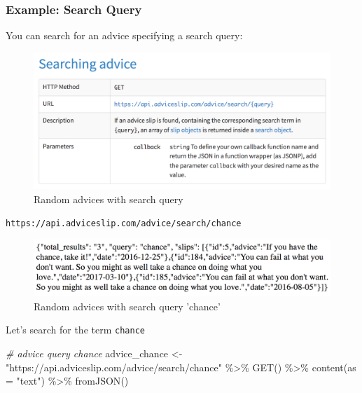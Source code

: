 \documentclass[
]{book}
\newenvironment{Shaded}{\begin{snugshade}}{\end{snugshade}}
\newcommand{\AttributeTok}[1]{\textcolor[rgb]{0.77,0.63,0.00}{#1}}
\newcommand{\CommentTok}[1]{\textcolor[rgb]{0.56,0.35,0.01}{\textit{#1}}}
\newcommand{\FunctionTok}[1]{\textcolor[rgb]{0.00,0.00,0.00}{#1}}
\newcommand{\NormalTok}[1]{#1}
\newcommand{\OtherTok}[1]{\textcolor[rgb]{0.56,0.35,0.01}{#1}}
\newcommand{\SpecialCharTok}[1]{\textcolor[rgb]{0.00,0.00,0.00}{#1}}
\newcommand{\StringTok}[1]{\textcolor[rgb]{0.31,0.60,0.02}{#1}}
\begin{document}
\hypertarget{example-search-query}{%
\subsubsection*{Example: Search Query}\label{example-search-query}}

You can search for an advice specifying a search query:

\begin{figure}

{\centering \includegraphics[width=0.7\linewidth]{images/api/advice-slip-search} 

}

\caption{Random advices with search query}\label{fig:unnamed-chunk-125}
\end{figure}

\texttt{https://api.adviceslip.com/advice/search/chance}

\begin{figure}

{\centering \includegraphics[width=0.75\linewidth]{images/api/advice-slip-chance} 

}

\caption{Random advices with search query 'chance'}\label{fig:unnamed-chunk-126}
\end{figure}

Let's search for the term \texttt{chance}

\begin{Shaded}
\begin{Highlighting}[]
\CommentTok{\# advice query \textquotesingle{}chance\textquotesingle{}}
\NormalTok{advice\_chance }\OtherTok{\textless{}{-}} \StringTok{"https://api.adviceslip.com/advice/search/chance"} \SpecialCharTok{\%\textgreater{}\%}
  \FunctionTok{GET}\NormalTok{() }\SpecialCharTok{\%\textgreater{}\%}
  \FunctionTok{content}\NormalTok{(}\AttributeTok{as =} \StringTok{"text"}\NormalTok{) }\SpecialCharTok{\%\textgreater{}\%}
  \FunctionTok{fromJSON}\NormalTok{()}
\end{Highlighting}
\end{Shaded}
\end{document}
